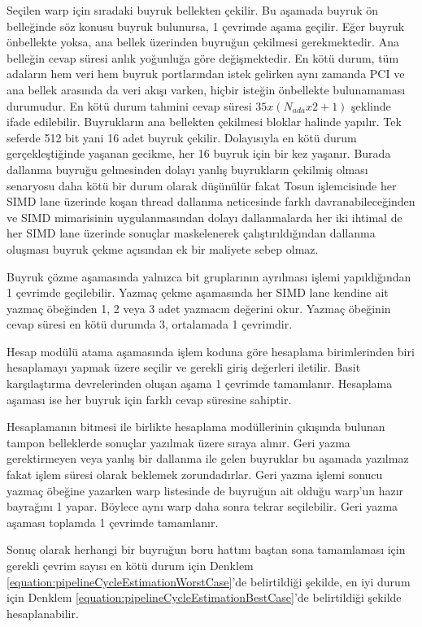 Seçilen warp için sıradaki buyruk bellekten çekilir. Bu aşamada buyruk ön belleğinde söz konusu buyruk bulunursa, 1 çevrimde aşama geçilir. Eğer buyruk önbellekte yoksa, ana bellek üzerinden buyruğun çekilmesi gerekmektedir. Ana belleğin cevap süresi anlık yoğunluğa göre değişmektedir. En kötü durum, tüm adaların hem veri hem buyruk portlarından istek gelirken aynı zamanda PCI ve ana bellek arasında da veri akışı varken, hiçbir isteğin önbellekte bulunamaması durumudur. En kötü durum tahmini cevap süresi $35 x ( N_{ada} x 2 + 1 )$ şeklinde ifade edilebilir. Buyrukların ana bellekten çekilmesi bloklar halinde yapılır. Tek seferde 512 bit yani 16 adet buyruk çekilir. Dolayısıyla en kötü durum gerçekleştiğinde yaşanan gecikme, her 16 buyruk için bir kez yaşanır. Burada dallanma buyruğu gelmesinden dolayı yanlış buyrukların çekilmiş olması senaryosu daha kötü bir durum olarak düşünülür fakat Tosun işlemcisinde her SIMD lane üzerinde koşan thread dallanma neticesinde farklı davranabileceğinden ve SIMD mimarisinin uygulanmasından dolayı dallanmalarda her iki ihtimal de her SIMD lane üzerinde sonuçlar maskelenerek çalıştırıldığından dallanma oluşması buyruk çekme açısından ek bir maliyete sebep olmaz.\par

Buyruk çözme aşamasında yalnızca bit gruplarının ayrılması işlemi yapıldığından 1 çevrimde geçilebilir. Yazmaç çekme aşamasında her SIMD lane kendine ait yazmaç öbeğinden 1, 2 veya 3 adet yazmacın değerini okur. Yazmaç öbeğinin cevap süresi en kötü durumda 3, ortalamada 1 çevrimdir.\par
Hesap modülü atama aşamasında işlem koduna göre hesaplama birimlerinden biri hesaplamayı yapmak üzere seçilir ve gerekli giriş değerleri iletilir. Basit karşılaştırma devrelerinden oluşan aşama 1 çevrimde tamamlanır. Hesaplama aşaması ise her buyruk için farklı cevap süresine sahiptir. \par
Hesaplamanın bitmesi ile birlikte hesaplama modüllerinin çıkışında bulunan tampon belleklerde sonuçlar yazılmak üzere sıraya alınır. Geri yazma gerektirmeyen veya yanlış bir dallanma ile gelen buyruklar bu aşamada yazılmaz fakat işlem süresi olarak beklemek zorundadırlar. Geri yazma işlemi sonucu yazmaç öbeğine yazarken warp listesinde de buyruğun ait olduğu warp'un hazır bayrağını 1 yapar. Böylece aynı warp daha sonra tekrar seçilebilir. Geri yazma aşaması toplamda 1 çevrimde tamamlanır.\par

Sonuç olarak herhangi bir buyruğun boru hattını baştan sona tamamlaması için gerekli çevrim sayısı en kötü durum için Denklem \ref{equation:pipelineCycleEstimationWorstCase}'de belirtildiği şekilde, en iyi durum için Denklem \ref{equation:pipelineCycleEstimationBestCase}'de belirtildiği şekilde hesaplanabilir.\par

